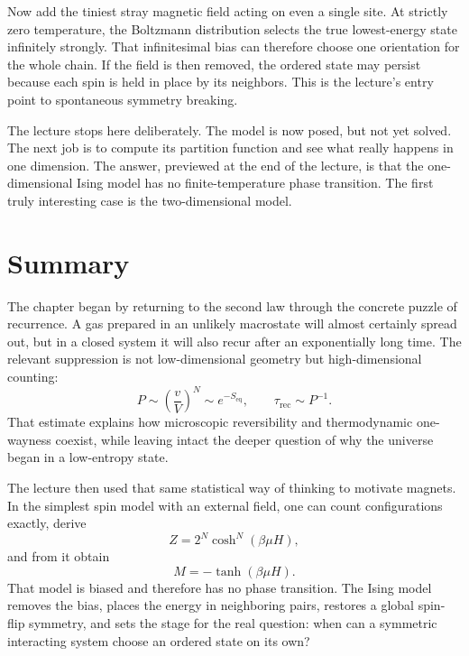 Now add the tiniest stray magnetic field acting on even a single site. At strictly zero temperature, the Boltzmann distribution selects the true lowest-energy state infinitely strongly. That infinitesimal bias can therefore choose one orientation for the whole chain. If the field is then removed, the ordered state may persist because each spin is held in place by its neighbors. This is the lecture's entry point to spontaneous symmetry breaking.

The lecture stops here deliberately. The model is now posed, but not yet solved. The next job is to compute its partition function and see what really happens in one dimension. The answer, previewed at the end of the lecture, is that the one-dimensional Ising model has no finite-temperature phase transition. The first truly interesting case is the two-dimensional model.

\section{Summary}

The chapter began by returning to the second law through the concrete puzzle of recurrence. A gas prepared in an unlikely macrostate will almost certainly spread out, but in a closed system it will also recur after an exponentially long time. The relevant suppression is not low-dimensional geometry but high-dimensional counting:
\[
P \sim \left(\frac{v}{V}\right)^N \sim e^{-S_{\mathrm{eq}}},
\qquad
\tau_{\mathrm{rec}} \sim P^{-1}.
\]
That estimate explains how microscopic reversibility and thermodynamic one-wayness coexist, while leaving intact the deeper question of why the universe began in a low-entropy state.

The lecture then used that same statistical way of thinking to motivate magnets. In the simplest spin model with an external field, one can count configurations exactly, derive
\[
Z=2^N\cosh^N(\beta\mu H),
\]
and from it obtain
\[
M=-\tanh(\beta\mu H).
\]
That model is biased and therefore has no phase transition. The Ising model removes the bias, places the energy in neighboring pairs, restores a global spin-flip symmetry, and sets the stage for the real question: when can a symmetric interacting system choose an ordered state on its own?